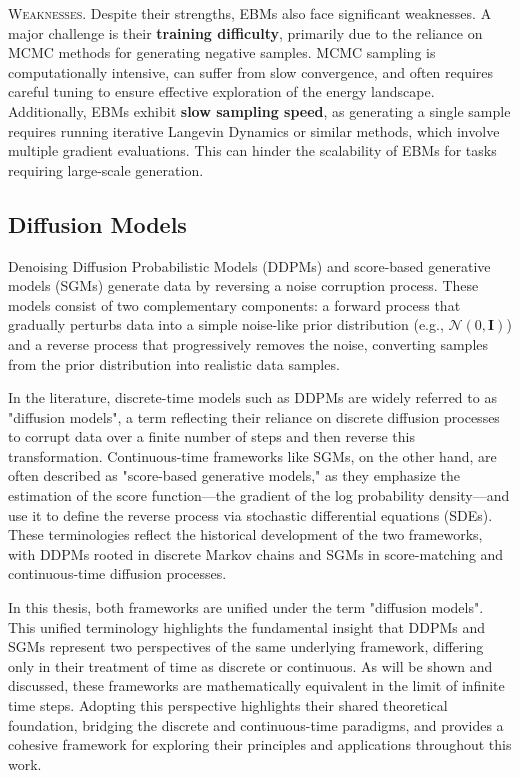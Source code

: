\textsc{Weaknesses.} Despite their strengths, EBMs also face significant weaknesses. A major challenge is their \textbf{training difficulty}, primarily due to the reliance on MCMC methods for generating negative samples. MCMC sampling is computationally intensive, can suffer from slow convergence, and often requires careful tuning to ensure effective exploration of the energy landscape. Additionally, EBMs exhibit \textbf{slow sampling speed}, as generating a single sample requires running iterative Langevin Dynamics or similar methods, which involve multiple gradient evaluations. This can hinder the scalability of EBMs for tasks requiring large-scale generation.


\subsection{Diffusion Models}

Denoising Diffusion Probabilistic Models (DDPMs) \cite{ho2020denoising} and score-based generative models (SGMs) \cite{song2021sde} generate data by reversing a noise corruption process. These models consist of two complementary components: a forward process that gradually perturbs data into a simple noise-like prior distribution (e.g., \( \mathcal{N}(0, \mathbf{I}) \)) and a reverse process that progressively removes the noise, converting samples from the prior distribution into realistic data samples.

In the literature, discrete-time models such as DDPMs are widely referred to as "diffusion models", a term reflecting their reliance on discrete diffusion processes to corrupt data over a finite number of steps and then reverse this transformation. Continuous-time frameworks like SGMs, on the other hand, are often described as "score-based generative models," as they emphasize the estimation of the score function—the gradient of the log probability density—and use it to define the reverse process via stochastic differential equations (SDEs). These terminologies reflect the historical development of the two frameworks, with DDPMs rooted in discrete Markov chains and SGMs in score-matching and continuous-time diffusion processes.

In this thesis, both frameworks are unified under the term "diffusion models". This unified terminology highlights the fundamental insight that DDPMs and SGMs represent two perspectives of the same underlying framework, differing only in their treatment of time as discrete or continuous. As will be shown and discussed, these frameworks are mathematically equivalent in the limit of infinite time steps. Adopting this perspective highlights their shared theoretical foundation, bridging the discrete and continuous-time paradigms, and provides a cohesive framework for exploring their principles and applications throughout this work.

